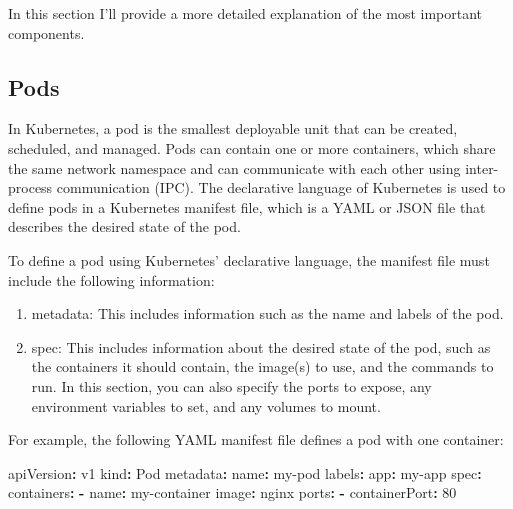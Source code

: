 \documentclass[
  11pt,
]{article}
\newenvironment{Shaded}{}{}
\newcommand{\AttributeTok}[1]{\textcolor[rgb]{0.49,0.56,0.16}{#1}}
\newcommand{\DecValTok}[1]{\textcolor[rgb]{0.25,0.63,0.44}{#1}}
\newcommand{\FunctionTok}[1]{\textcolor[rgb]{0.02,0.16,0.49}{#1}}
\newcommand{\KeywordTok}[1]{\textcolor[rgb]{0.00,0.44,0.13}{\textbf{#1}}}
\begin{document}
In this section I'll provide a more detailed explanation of the most
important components.

\hypertarget{pods}{%
\subsection{Pods}\label{pods}}

In Kubernetes, a pod is the smallest deployable unit that can be
created, scheduled, and managed. Pods can contain one or more
containers, which share the same network namespace and can communicate
with each other using inter-process communication (IPC). The declarative
language of Kubernetes is used to define pods in a Kubernetes manifest
file, which is a YAML or JSON file that describes the desired state of
the pod.

To define a pod using Kubernetes' declarative language, the manifest
file must include the following information:

\begin{enumerate}
\def\labelenumi{\arabic{enumi}.}
\item
  metadata: This includes information such as the name and labels of the
  pod.
\item
  spec: This includes information about the desired state of the pod,
  such as the containers it should contain, the image(s) to use, and the
  commands to run. In this section, you can also specify the ports to
  expose, any environment variables to set, and any volumes to mount.
\end{enumerate}

For example, the following YAML manifest file defines a pod with one
container:

\begin{Shaded}
\begin{Highlighting}[]
\FunctionTok{apiVersion}\KeywordTok{:}\AttributeTok{ v1}
\FunctionTok{kind}\KeywordTok{:}\AttributeTok{ Pod}
\FunctionTok{metadata}\KeywordTok{:}
\AttributeTok{  }\FunctionTok{name}\KeywordTok{:}\AttributeTok{ my{-}pod}
\AttributeTok{  }\FunctionTok{labels}\KeywordTok{:}
\AttributeTok{    }\FunctionTok{app}\KeywordTok{:}\AttributeTok{ my{-}app}
\FunctionTok{spec}\KeywordTok{:}
\AttributeTok{  }\FunctionTok{containers}\KeywordTok{:}
\AttributeTok{  }\KeywordTok{{-}}\AttributeTok{ }\FunctionTok{name}\KeywordTok{:}\AttributeTok{ my{-}container}
\AttributeTok{    }\FunctionTok{image}\KeywordTok{:}\AttributeTok{ nginx}
\AttributeTok{    }\FunctionTok{ports}\KeywordTok{:}
\AttributeTok{    }\KeywordTok{{-}}\AttributeTok{ }\FunctionTok{containerPort}\KeywordTok{:}\AttributeTok{ }\DecValTok{80}
\end{Highlighting}
\end{Shaded}
\end{document}
